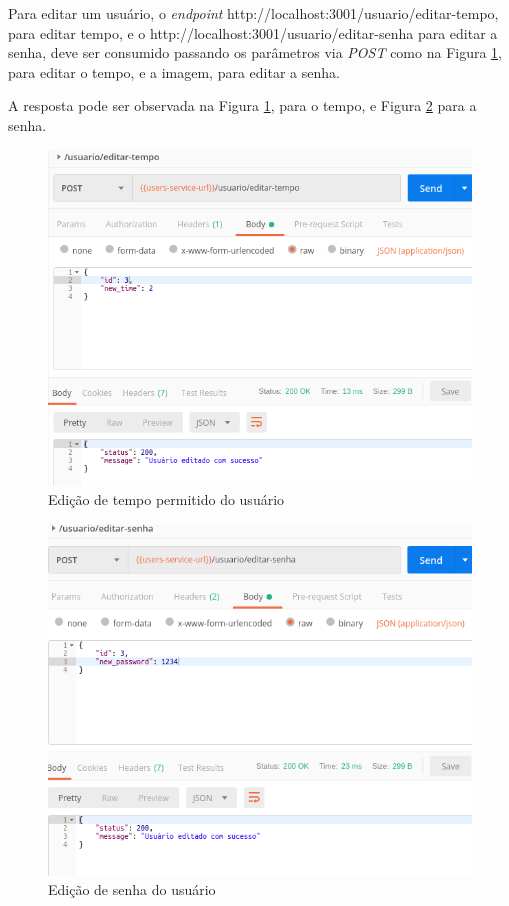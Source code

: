 \clearpage

Para editar um usuário, o \textit{endpoint} http://localhost:3001/usuario/editar-tempo, para editar tempo, e o http://localhost:3001/usuario/editar-senha para editar a senha, deve ser consumido passando os parâmetros via \textit{POST} como na Figura \ref{fig:tempo}, para editar o tempo, e a imagem, para editar a senha.

A resposta pode ser observada na Figura \ref{fig:tempo}, para o tempo, e Figura \ref{fig:senha} para a senha.

\begin{figure}[htbp]
	\centering
	\includegraphics[width=0.7\linewidth]{figuras/postman/time.png}
	\caption{Edição de tempo permitido do usuário}
	\label{fig:tempo}
\end{figure}

\begin{figure}[htbp]
	\centering
	\includegraphics[width=0.7\linewidth]{figuras/postman/password.png}
	\caption{Edição de senha do usuário}
	\label{fig:senha}
\end{figure}

